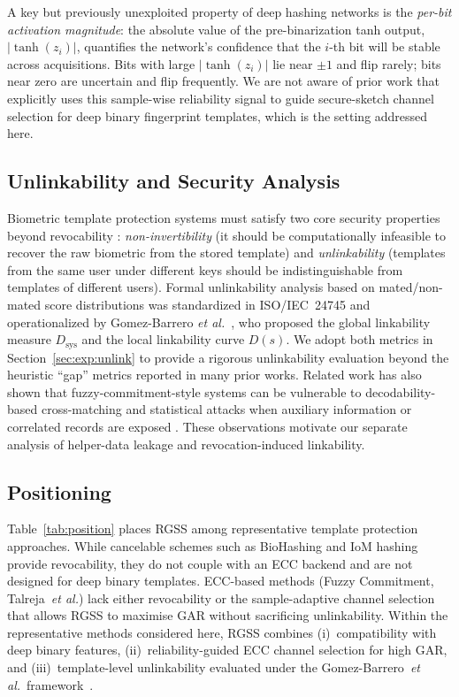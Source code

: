 \documentclass[journal]{IEEEtran}
\newcommand{\etal}{\textit{et al.}}
\begin{document}
A key but previously unexploited property of deep hashing networks
is the \emph{per-bit activation magnitude}: the absolute value of
the pre-binarization tanh output, $|\tanh(z_i)|$, quantifies the
network's confidence that the $i$-th bit will be stable across
acquisitions.
Bits with large $|\tanh(z_i)|$ lie near $\pm 1$ and flip rarely;
bits near zero are uncertain and flip frequently.
We are not aware of prior work that explicitly uses this sample-wise
reliability signal to guide secure-sketch channel selection for deep
binary fingerprint templates, which is the setting addressed here.

\subsection{Unlinkability and Security Analysis}

Biometric template protection systems must satisfy two core security
properties beyond revocability \cite{nandakumar2015biometric}:
\emph{non-invertibility} (it should be computationally infeasible to
recover the raw biometric from the stored template) and
\emph{unlinkability} (templates from the same user under different
keys should be indistinguishable from templates of different users).
Formal unlinkability analysis based on mated/non-mated score
distributions was standardized in ISO/IEC~24745 \cite{iso24745}
and operationalized by Gomez-Barrero \etal\
\cite{gomez2017unlinkability}, who proposed the global linkability
measure $D_\text{sys}$ and the local linkability curve $D(s)$.
We adopt both metrics in Section~\ref{sec:exp:unlink} to provide a
rigorous unlinkability evaluation beyond the heuristic ``gap''
metrics reported in many prior works.
Related work has also shown that fuzzy-commitment-style systems can
be vulnerable to decodability-based cross-matching and statistical
attacks when auxiliary information or correlated records are exposed
\cite{kelkboom2011preventing,rathgeb2012statistical}.
These observations motivate our separate analysis of helper-data
leakage and revocation-induced linkability.

\subsection{Positioning}
\label{sec:related:position}

Table~\ref{tab:position} places RGSS among representative template
protection approaches.
While cancelable schemes such as BioHashing and IoM hashing
provide revocability, they do not couple with an ECC backend and
are not designed for deep binary templates.
ECC-based methods (Fuzzy Commitment, Talreja~\etal) lack either
revocability or the sample-adaptive channel selection that allows
RGSS to maximise GAR without sacrificing unlinkability.
Within the representative methods considered here, RGSS combines
(i)~compatibility with deep binary features,
(ii)~reliability-guided ECC channel selection for high GAR, and
(iii)~template-level unlinkability evaluated under the
Gomez-Barrero~\etal\ framework~\cite{gomez2017unlinkability}.
\end{document}
